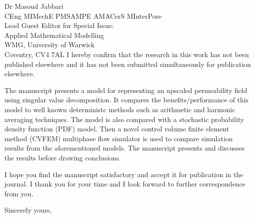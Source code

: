 \documentclass[11pt]{letter} %
\begin{document}
\begin{letter}{Dr Masoud Jabbari \\
CEng MIMechE PMSAMPE AMACerS MInterPore \\
Lead Guest Editor for Special Issue: \\
Applied Mathematical Modelling \\
WMG, University of Warwick \\
Coventry, CV4 7AL}
I hereby confirm that the research in this work has not been published elsewhere and it has not been submitted simultaneously for publication elsewhere.
 
The manuscript presents a model for representing an upscaled permeability field using singular value decomposition. It compares the benefits/performance of this model to well known deterministc methods such as arithmetic and harmonic averaging techniques. The model is also compared with a stochastic probability density function (PDF) model. Then a novel control volume finite element method (CVFEM) multiphase flow simulator is used to compare simulation results from the aforementioned models. The manuscript presents and discusses the results before drawing conclusions.

I hope you find the manuscript satisfactory and accept it for publication in the journal. I thank you for your time and I look forward to further correspondence from you.

\closing{Sincerely yours,}




\end{letter}
\end{document}
